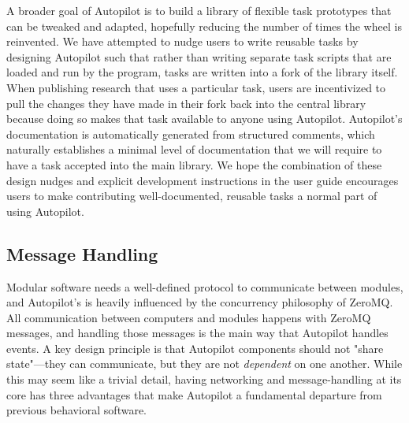 A broader goal of Autopilot is to build a library of flexible task prototypes that can be tweaked and adapted, hopefully reducing the number of times the wheel is reinvented. We have attempted to nudge users to write reusable tasks by designing Autopilot such that rather than writing separate task scripts that are loaded and run by the program, tasks are written into a fork of the library itself. When publishing research that uses a particular task, users are incentivized to pull the changes they have made in their fork back into the central library because doing so makes that task available to anyone using Autopilot. Autopilot's documentation is automatically generated from structured comments, which naturally establishes a minimal level of documentation that we will require to have a task accepted into the main library. We hope the combination of these design nudges and explicit development instructions in the user guide encourages users to make contributing well-documented, reusable tasks a normal part of using Autopilot.


\subsection{Message Handling}

Modular software needs a well-defined protocol to communicate between modules, and Autopilot's is heavily influenced by the concurrency philosophy of ZeroMQ\citep{hintjensZeroMQMessagingMany2013}. All communication between computers and modules happens with ZeroMQ messages, and handling those messages is the main way that Autopilot handles events. A key design principle is that Autopilot components should not "share state"---they can communicate, but they are not \textit{dependent} on one another. While this may seem like a trivial detail, having networking and message-handling at its core has three advantages that make Autopilot a fundamental departure from previous behavioral software.

